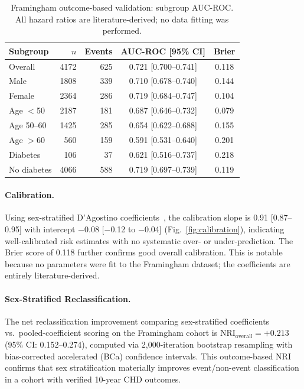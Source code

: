 \documentclass[runningheads]{llncs}
\begin{document}
\begin{table}[t]
\centering
\caption{Framingham outcome-based validation: subgroup AUC-ROC.
All hazard ratios are literature-derived; no data fitting was performed.}
\label{tab:framingham_sub}
\small
\begin{tabular}{@{}lrrcc@{}}
\toprule
\textbf{Subgroup} & \textbf{$n$} & \textbf{Events} & \textbf{AUC-ROC [95\% CI]} & \textbf{Brier} \\
\midrule
Overall     & 4172 & 625 & 0.721 [0.700--0.741] & 0.118 \\
Male        & 1808 & 339 & 0.710 [0.678--0.740] & 0.144 \\
Female      & 2364 & 286 & 0.719 [0.684--0.747] & 0.104 \\
Age ${<}$50 & 2187 & 181 & 0.687 [0.646--0.732] & 0.079 \\
Age 50--60  & 1425 & 285 & 0.654 [0.622--0.688] & 0.155 \\
Age ${>}$60 &  560 & 159 & 0.591 [0.531--0.640] & 0.201 \\
Diabetes    &  106 &  37 & 0.621 [0.516--0.737] & 0.218 \\
No diabetes & 4066 & 588 & 0.719 [0.697--0.739] & 0.119 \\
\bottomrule
\end{tabular}
\end{table}

\paragraph{Calibration.}
Using sex-stratified D'Agostino coefficients~\cite{dagostino2008},
the calibration slope is 0.91 [0.87--0.95] with intercept $-$0.08
[$-$0.12 to $-$0.04] (Fig.~\ref{fig:calibration}), indicating well-calibrated risk estimates
with no systematic over- or under-prediction.  The Brier score of
0.118 further confirms good overall calibration.  This is notable
because no parameters were fit to the Framingham dataset; the
coefficients are entirely literature-derived.

\paragraph{Sex-Stratified Reclassification.}
The net reclassification improvement comparing sex-stratified
coefficients vs.\ pooled-coefficient scoring on the Framingham cohort
is $\text{NRI}_{\text{overall}} = +0.213$ (95\% CI: 0.152--0.274),
computed via 2{,}000-iteration bootstrap resampling with
bias-corrected accelerated (BCa) confidence intervals.  This
outcome-based NRI confirms that sex stratification materially improves
event/non-event classification in a cohort with verified 10-year CHD
outcomes.
\end{document}

